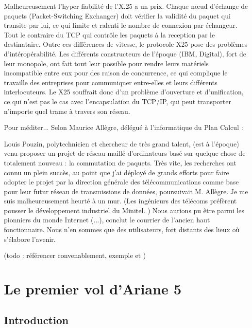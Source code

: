 \documentclass[12pt]{report}
\begin{document}
Malheureusement l'hyper fiabilité de l'X.25 a un prix. Chaque nœud d'échange de paquets (Packet-Switching Exchanger) doit vérifier la validité du paquet qui
transite par lui, ce qui limite et ralenti le nombre de connexion par échangeur. Tout le contraire du TCP qui contrôle les paquets à la reception par le destinataire.
Outre ces différences de vitesse, le protocole X25 pose des problèmes d'intéropérabilité. Les différents constructeurs de l'époque (IBM, Digital), fort de leur monopole,
ont fait tout leur possible pour rendre leurs matériels incompatible entre eux pour des raison de concurrence, ce qui complique le travaille des entreprises pour
communiquer entre-elles et leurs différents interlocuteurs. Le X25 souffrait donc d'un problème d'ouverture et d'unification, ce qui n'est pas le cas avec l'encapsulation du TCP/IP,
qui peut transporter n'importe quel trame à travers son réseau.

Pour méditer... Selon Maurice Allègre, délégué à l'informatique du Plan Calcul :

\og Louis Pouzin, polytechnicien et chercheur de très grand talent, (est à l'époque) venu proposer un projet de réseau maillé d'ordinateurs basé sur quelque chose de totalement nouveau : la commutation de paquets. Très vite, les recherches ont connu un plein succès, au point que j'ai déployé de grands efforts pour faire adopter le projet par la direction générale des télécommunications comme base pour leur futur réseau de transmissions de données, poursuivait M. Allègre. Je me suis malheureusement heurté à un mur. (Les ingénieurs des télécoms préfèrent pousser le développement industriel du Minitel. ) Nous aurions pu être parmi les pionniers du monde Internet (...), conclut le courrier de l'ancien haut fonctionnaire. Nous n'en sommes que des utilisateurs, fort distants des lieux où s'élabore l'avenir. \fg

(todo : référencer convenablement, exemple \cite{gateau} et \cite{gatoux})


\chapter{Le premier vol d'Ariane 5}

\section{Introduction}
\end{document}
